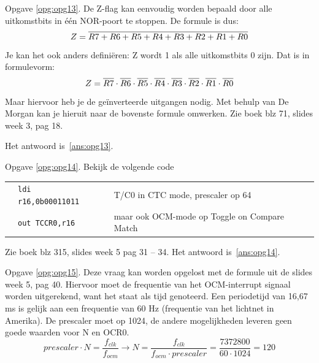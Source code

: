 \documentclass[a4paper,12pt,fleqn,dutch,mimicwordtwentyten]{tisdexam}
\newcommand*{\oline}[1]{\overline{#1\mathstrut}}
\begin{document}
\begin{questions}
\vspace{1em}
Opgave \ref{opg:opg13}.\label{sol:opg13}
De Z-flag kan eenvoudig worden bepaald door alle uitkomstbits in \'{e}\'{e}n
NOR-poort te stoppen. De formule is dus:
\begin{equation*}
Z = \oline{R7+R6+R5+R4+R3+R2+R1+R0}
\end{equation*} 
Je kan het ook anders defini\"{e}ren: Z wordt 1 als alle uitkomstbits 0 zijn.
Dat is in formulevorm:
\begin{equation*}
Z = \oline{R7}\cdot\oline{R6}\cdot\oline{R5}\cdot\oline{R4}\cdot
    \oline{R3}\cdot\oline{R2}\cdot\oline{R1}\cdot\oline{R0}
\end{equation*}
Maar hiervoor heb je de ge\"{i}nverteerde uitgangen nodig. Met behulp van De
Morgan kan je hieruit naar de bovenste formule omwerken. Zie boek blz 71,
slides week 3, pag 18.

Het antwoord is~\ref{ans:opg13}.

\vspace{1em}
Opgave \ref{opg:opg14}.\label{sol:opg14}
Bekijk de volgende code

\begin{table}[h!]
	\begin{tabular}{l l l l}
		 & \texttt{ldi r16,0b00011011}   &  &  T/C0 in CTC mode, prescaler op 64  \\ 
	 	 & \texttt{out TCCR0,r16}        &  &  maar ook OCM-mode op Toggle on Compare Match  \\ 
	\end{tabular} 
\end{table}

Zie boek blz 315, slides week 5 pag 31 -- 34. Het antwoord is~\ref{ans:opg14}.

\vspace{1em}
Opgave \ref{opg:opg15}.\label{sol:opg15}
Deze vraag kan worden opgelost met de formule uit de slides week 5, pag 40.
Hiervoor moet de frequentie van het OCM-interrupt signaal worden uitgerekend,
want het staat als tijd genoteerd. Een periodetijd van 16,67 ms is gelijk aan
een frequentie van 60 Hz (frequentie van het lichtnet in Amerika). De
prescaler moet op 1024, de andere mogelijkheden leveren geen goede waarden
voor N en OCR0.
\begin{equation*}
prescaler \cdot N = \dfrac{f_{clk}}{f_{ocm}} 
              \longrightarrow N = \dfrac{f_{clk}}{f_{ocm} \cdot prescaler}
			= \dfrac{7372800}{60 \cdot 1024} = 120
\end{equation*} 


\end{questions}
\end{document}
